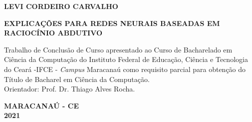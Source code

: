 \begin{titlepage}

\begin{center}
\textbf{LEVI CORDEIRO CARVALHO\\}
\vspace{7,5cm}

		\textbf{EXPLICAÇÕES PARA REDES NEURAIS BASEADAS EM RACIOCÍNIO ABDUTIVO}\\

\vspace{2.5cm}

\vspace{2cm}
\begin{flushright}
	\begin{minipage}[l]{8cm}
		Trabalho de Conclusão de Curso apresentado ao Curso de Bacharelado em Ciência da Computação do Instituto Federal de Educação, Ciência e Tecnologia do Ceará -IFCE - {\it{Campus}} Maracanaú como requisito parcial para obtenção do Título de Bacharel em Ciência da Computação.\\
		Orientador: Prof. Dr. Thiago Alves Rocha.
	\end{minipage}
\end{flushright}

\end{center}

\vfill
\centering
		
			\textbf{MARACANAÚ - CE \\2021}

\end{titlepage}




